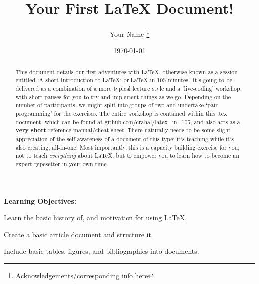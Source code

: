\documentclass[a4paper, 12pt]{article}
\begin{document}


\title{Your First \LaTeX{} Document!}					%
\date{\today}										%
\author{Your Name$^{\ddagger}$\thanks{Acknowledgements/corresponding info here}}	%
\maketitle 											%
					
\begin{abstract}										%
This document details our first adventures with \LaTeX, otherwise known as a session entitled `A short Introduction to \LaTeX{}: or \LaTeX{} in 105 minutes'. It's going to be delivered as a combination of a more typical lecture style and a `live-coding' workshop, with short pauses for you to try and implement things as we go. Depending on the number of participants, we might split into groups of two and undertake `pair-programming' for the exercises. The entire workshop is contained within this .tex document, which can be found at \href{github.com/crahal/latex_in_105}{github.com/crahal/latex\_in\_105}, and also acts as a \textbf{very short} reference manual/cheat-sheet. There naturally needs to be some slight appreciation of the  self-awareness of a document of this type; it's teaching while it's also creating, all-in-one! Most importantly, this is a capacity building exercise for you; not to teach \textit{everything} about \LaTeX{}, but to empower you to learn how to become an expert typesetter in your own time.
\end{abstract} \vspace{.2in}					%

\textbf{Learning Objectives:}					%
\begin{itemize}								%
{\setlength\itemindent{25pt}					%
\item Learn the basic history of, and motivation for using \LaTeX{}.		%
\item Create a basic article document and structure it.
\item Include basic tables, figures, and bibliographies into documents.}	%
\end{itemize} \vspace{0.2in}					%
\end{document}
